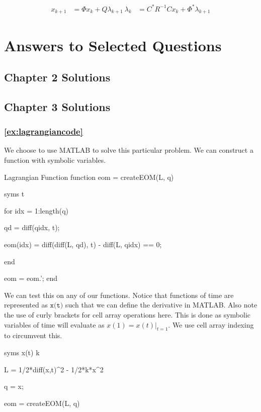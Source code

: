 
\begin{align}
x_{k+1} &= \Phi x_k + Q \lambda_{k+1} \
\lambda_k &= C^* R^{-1} C x_k + \Phi^* \lambda_{k+1}
\end{align}


\chapter{Answers to Selected Questions}

\section{Chapter 2 Solutions}



\section{Chapter 3 Solutions}

\subsection*{\texorpdfstring{\autoref{ex:lagrangiancode}}{Lagrangian In Code}}

We choose to use MATLAB to solve this particular problem. We can construct a function with symbolic variables.
\begin{matlabscript}{Lagrangian Function}
function eom = createEOM(L, q)
%

syms t


for idx = 1:length(q)

    qd = diff(q{idx}, t);

    eom(idx) = diff(diff(L, qd), t) - diff(L, q{idx}) == 0;

end

eom = eom.';
end
\end{matlabscript}

We can test this on any of our functions. Notice that functions of time are represented as $\texttt{x(t)}$ such that we can define the derivative in MATLAB. Also note the use of curly brackets for cell array operations here. This is done as symbolic variables of time will evaluate as $x(1)=x(t)\vert_{t=1}$. We use cell array indexing to circumvent this.
\begin{matlabscript}{}
syms x(t) k

L = 1/2*diff(x,t)^2 - 1/2*k*x^2

q = {x};

eom = createEOM(L, q)
\end{matlabscript}


